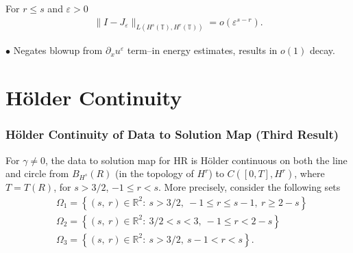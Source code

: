 \documentclass{beamer}
\newcommand{\rr}{\mathbb{R}}
\newcommand{\p}{\partial}
\newcommand{\ci}{\mathbb{T}}
\newcommand{\ee}{\varepsilon}
\begin{document}
\begin{frame}
  \begin{lemma}
For $r \le s$ and $\ee>0$
%
%
\begin{equation*}
\begin{split}
\|I - J_\ee\|_{L(H^s(\ci), H^r(\ci))} = o(\ee^{s-r}).
\end{split}
\end{equation*}
%
%
\end{lemma}
\pause
$\bullet$ Negates blowup from $\p_{x} u^{\ee}$ term--in energy estimates, results in $o(1)$ decay.
\end{frame}
\section{H\"older Continuity} 
\begin{frame}
  \frametitle{H\"older Continuity of Data to Solution Map (Third Result)}
\begin{theorem}
For $\gamma \neq 0$, the
data to solution map for HR is H\"older continuous on both the line and circle from $B_{H^{s}}(R)$ (in
the topology of $H^{r}$) to $C([0, T], H^{r})$, where $T = T(R)$, for $s >
3/2$, $-1 \le r < s$. More
precisely, consider the following sets 
%
%
\begin{equation*}
\begin{split}
& \Omega_{1} = \left\{ (s, \ r) \in \rr^{2}:
\ s>3/2, \ -1 \le r \le s-1, \  r \ge 2 -s  \right\}
\\
& \Omega_{2} = \left\{ (s, \ r) \in \rr^{2}:
\ 3/2 < s < 3, \ -1 \le r < 2-s \right\}
\\
& \Omega_{3} = \left\{ (s, \ r) \in \rr^{2}:
\  s>3/2, \  s-1 < r < s  \right\}.
\end{split}
\end{equation*}
%
\end{theorem}
\end{frame}
\begin{frame}
%
%
\begin{center}
\end{center}
%
\end{frame}
\end{document}
